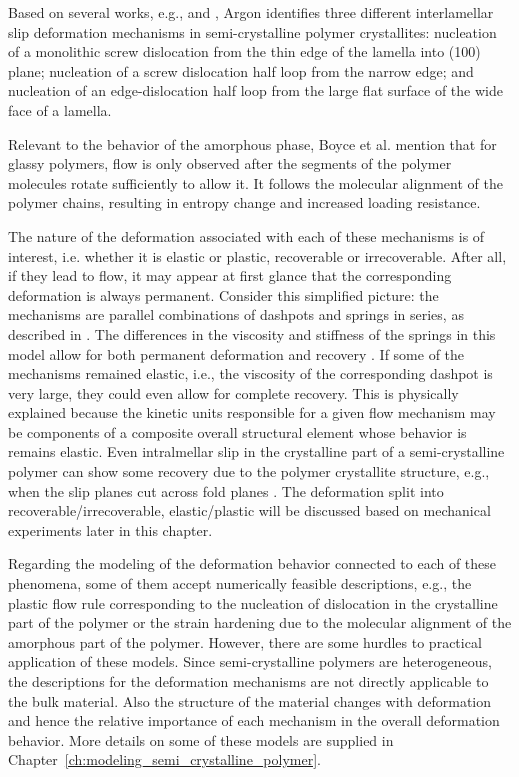Based on several works, e.g., \cite{petersonThermalInitiationScrew1966} and \cite{linRateMechanismPlasticity1994}, Argon \citep{argonPhysicsDeformationFracture2013a} identifies three different interlamellar slip deformation mechanisms in semi-crystalline polymer crystallites: nucleation of a monolithic screw dislocation from the thin edge of the lamella into (100) plane; nucleation of a screw dislocation half loop from the narrow edge; and nucleation of an edge-dislocation half loop from the large flat surface of the wide face of a lamella.

Relevant to the behavior of the amorphous phase, Boyce et al. \citep{boyceLargeInelasticDeformation1988} mention that for glassy polymers, flow is only observed after the segments of the polymer molecules rotate sufficiently to allow it.
It follows the molecular alignment of the polymer chains, resulting in entropy change and increased loading resistance.

The nature of the deformation associated with each of these mechanisms is of interest, i.e. whether it is elastic or plastic, recoverable or irrecoverable.
After all, if they lead to flow, it may appear at first glance that the corresponding deformation is always permanent.
Consider this simplified picture: the mechanisms are parallel combinations of dashpots and springs in series, as described in \cite{kellerIdentificationStructuralProcesses1971}.
The differences in the viscosity and stiffness of the springs in this model allow for both permanent deformation and recovery \citep{fotheringhamRoleRecoveryForces1978}.
If some of the mechanisms remained elastic, i.e., the viscosity of the corresponding dashpot is very large, they could even allow for complete recovery.
This is physically explained because the kinetic units responsible for a given flow mechanism may be components of a composite overall structural element whose behavior is remains elastic.
Even intralmellar slip in the crystalline part of a semi-crystalline polymer can show some recovery due to the polymer crystallite structure, e.g., when the slip planes cut across fold planes \citep{kellerIdentificationStructuralProcesses1971}.
The deformation split into recoverable/irrecoverable, elastic/plastic will be discussed based on mechanical experiments later in this chapter.

Regarding the modeling of the deformation behavior connected to each of these phenomena, some of them accept numerically feasible descriptions, e.g., the plastic flow rule corresponding to the nucleation of dislocation in the crystalline part of the polymer or the strain hardening due to the molecular alignment of the amorphous part of the polymer.
However, there are some hurdles to practical application of these models.
Since semi-crystalline polymers are heterogeneous, the descriptions for the deformation mechanisms are not directly applicable to the bulk material.
Also the structure of the material changes with deformation and hence the relative importance of each mechanism in the overall deformation behavior.
More details on some of these models are supplied in Chapter~\ref{ch:modeling_semi_crystalline_polymer}.

